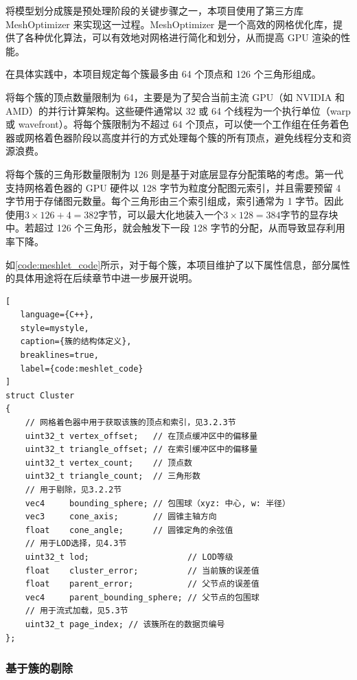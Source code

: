 将模型划分成簇是预处理阶段的关键步骤之一，本项目使用了第三方库 MeshOptimizer 来实现这一过程\cite{meshoptimizer}。MeshOptimizer 是一个高效的网格优化库，提供了各种优化算法，可以有效地对网格进行简化和划分，从而提高 GPU 渲染的性能。

在具体实践中，本项目规定每个簇最多由 64 个顶点和 126 个三角形组成。

将每个簇的顶点数量限制为 64，主要是为了契合当前主流 GPU（如 NVIDIA 和 AMD）的并行计算架构。这些硬件通常以 32 或 64 个线程为一个执行单位（warp 或 wavefront）。将每个簇限制为不超过 64 个顶点，可以使一个工作组在任务着色器或网格着色器阶段以高度并行的方式处理每个簇的所有顶点，避免线程分支和资源浪费。

将每个簇的三角形数量限制为 126 则是基于对底层显存分配策略的考虑。第一代支持网格着色器的 GPU 硬件以 128 字节为粒度分配图元索引，并且需要预留 4 字节用于存储图元数量。每个三角形由三个索引组成，索引通常为 1 字节。因此使用$ 3 \times 126 + 4 = 382 $字节，可以最大化地装入一个$ 3 \times 128 = 384 $字节的显存块中。若超过 126 个三角形，就会触发下一段 128 字节的分配，从而导致显存利用率下降\cite{Kubisch2018}。

如\autoref{code:meshlet_code}所示，对于每个簇，本项目维护了以下属性信息，部分属性的具体用途将在后续章节中进一步展开说明。

\begin{lstlisting}[
   language={C++},
   style=mystyle,
   caption={簇的结构体定义},
   breaklines=true, 
   label={code:meshlet_code}
]
struct Cluster
{
    // 网格着色器中用于获取该簇的顶点和索引，见3.2.3节
	uint32_t vertex_offset;   // 在顶点缓冲区中的偏移量
	uint32_t triangle_offset; // 在索引缓冲区中的偏移量
	uint32_t vertex_count;    // 顶点数
	uint32_t triangle_count;  // 三角形数
    // 用于剔除，见3.2.2节
	vec4     bounding_sphere; // 包围球（xyz: 中心, w: 半径）
	vec3     cone_axis;       // 圆锥主轴方向
    float    cone_angle;      // 圆锥定角的余弦值
    // 用于LOD选择，见4.3节
    uint32_t lod;                    // LOD等级
    float    cluster_error;          // 当前簇的误差值
    float    parent_error;           // 父节点的误差值
    vec4     parent_bounding_sphere; // 父节点的包围球
    // 用于流式加载，见5.3节
	uint32_t page_index; // 该簇所在的数据页编号
};
\end{lstlisting}

\subsubsection{基于簇的剔除} \label{subsubsec:cluster culling}

